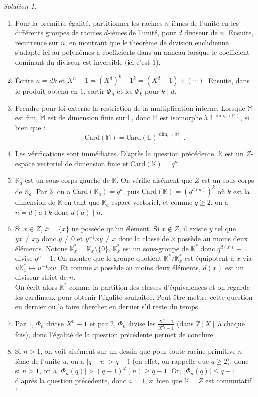 \documentclass[french]{book}
\newcommand{\Z}{\mathbb{Z}}
\newcommand{\K}{\mathbb{K}}
\renewcommand{\L}{\mathbb{L}}
\newcommand{\st}{^*}
\newcommand{\inv}{^{-1}}
\newcommand{\card}{\text{Card}}
\theoremstyle{definition}
\theoremstyle{remark}
\newtheorem*{sol}{Solution}
\begin{document}
\begin{sol}
	\begin{enumerate}
		\item Pour la première égalité, partitionner les racines $n$-ièmes de l'unité en les différents groupes de racines $d$-ièmes de l'unité, pour $d$ diviseur de $n$. Ensuite, récurrence sur $n$, en montrant que le théorème de division euclidienne s'adapte ici au polynômes à coefficients dans un anneau lorsque le coefficient dominant du diviseur est inversible (ici c'est $1$).
		\item Écrire $n=dk$ et $X^n-1=(X^d)^k-1^k=(X^d-1)\times(\cdots)$. Ensuite, dans le produit obtenu en $1$, sortir $\Phi_n$ et les $\Phi_k$ pour $k\mid d$.
		\item Prendre pour loi externe la restriction de la multiplication interne. Lorsque $\mathbb{M}$ est fini, $\mathbb{M}$ est de dimension finie sur $\L$, donc $\mathbb{M}$ est isomorphe à $\L^{\dim_\L(\mathbb{M})}$, si bien que :
		$$\card(\mathbb{M})=\card(\L)^{\dim_\L(\mathbb{M})}.$$
		\item Les vérifications sont immédiates. D'après la question précédente, $\K$ est un $Z$-espace vectoriel de dimension finie et $\card(\K)=q^n$.
		\item $\K_a$ est un sous-corps gauche de $\K$. On vérifie aisément que $Z$ est un sous-corps de $\K_a$. Par $3$, on a $\card(\K_a)=q^d$, puis $\card(\K)=(q^{d(a)})^k$ où $k$ est la dimension de $\K$ en tant que $\K_a$-espace vectoriel, et comme $q\geqslant 2$, on a $n=d(a)k$ donc $d(a)\mid n$.
		\item Si $x\in Z$, $\overline{x}=\{x\}$ ne possède qu'un élément. Si $x\notin Z$, il existe $y$ tel que $yx\ne xy$ donc $y\ne 0$ et $y\inv xy\ne x$ donc la classe de $x$ possède au moins deux éléments. Notons $\K_x\st=\K_x\setminus\{0\}$. $\K_x\st$ est un sous-groupe de $\K\st$ donc $q^{d(x)}-1$ divise $q^n-1$. On montre que le groupe quotient $\K\st /\K_x\st$ est équipotent à $\overline{x}$ via $u\K_x\st\mapsto u\inv x u$. Et comme $\overline{x}$ possède au moins deux éléments, $d(x)$ est un diviseur strict de $n$. \\
		On écrit alors $\K\st$ comme la partition des classes d'équivalences et on regarde les cardinaux pour obtenir l'égalité souhaitée. Peut-être mettre cette question en dernier ou la faire chercher en dernier s'il reste du temps.
		\item Par $1$, $\Phi_n$ divise $X^n-1$ et par $2$, $\Phi_n$ divise les $\displaystyle\frac{X^n-1}{X^{d_i}-1}$ (dans $\Z[X]$ à chaque fois), donc l'égalité de la question précédente permet de conclure.
		\item Si $n>1$, on voit aisément sur un dessin que pour toute racine primitive $n$-ième de l'unité $u$, on a $\lvert q-u\rvert>q-1$ (en effet, on rappelle que $q\geqslant 2$), donc si $n>1$, on a $\lvert\Phi_n(q)\rvert>(q-1)^\varphi(n)\geqslant q-1$. Or, $\lvert\Phi_n(q)\rvert\leqslant q-1$ d'après la question précédente, donc $n=1$, si bien que $\K=Z$ est commutatif !
	\end{enumerate}
\end{sol}
\end{document}
